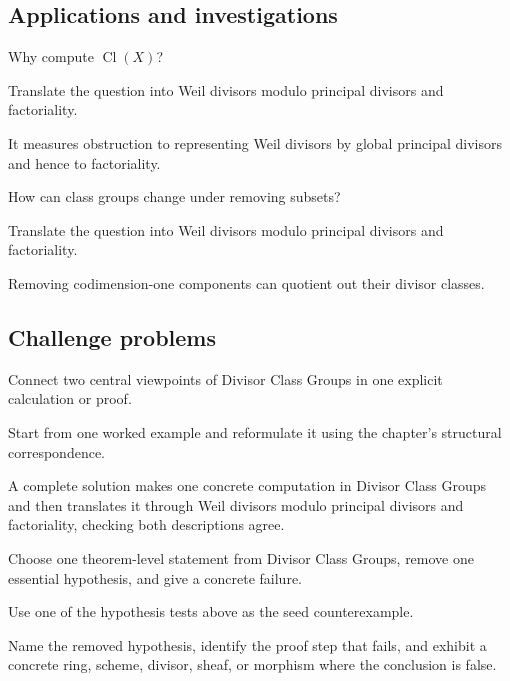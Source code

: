 \subsection*{Applications and investigations}

\begin{exercise}\label{exr:vi41-expand-13}
Why compute $\operatorname{Cl}(X)$?
\end{exercise}
\begin{hint}
Translate the question into Weil divisors modulo principal divisors and factoriality.
\end{hint}
\begin{solution}
It measures obstruction to representing Weil divisors by global principal divisors and hence to factoriality.
\end{solution}

\begin{exercise}\label{exr:vi41-expand-14}
How can class groups change under removing subsets?
\end{exercise}
\begin{hint}
Translate the question into Weil divisors modulo principal divisors and factoriality.
\end{hint}
\begin{solution}
Removing codimension-one components can quotient out their divisor classes.
\end{solution}

\subsection*{Challenge problems}

\begin{exercise}\label{exr:vi41-expand-15}
Connect two central viewpoints of Divisor Class Groups in one explicit calculation or proof.
\end{exercise}
\begin{hint}
Start from one worked example and reformulate it using the chapter's structural correspondence.
\end{hint}
\begin{solution}
A complete solution makes one concrete computation in Divisor Class Groups and then translates it through Weil divisors modulo principal divisors and factoriality, checking both descriptions agree.
\end{solution}

\begin{exercise}\label{exr:vi41-expand-16}
Choose one theorem-level statement from Divisor Class Groups, remove one essential hypothesis, and give a concrete failure.
\end{exercise}
\begin{hint}
Use one of the hypothesis tests above as the seed counterexample.
\end{hint}
\begin{solution}
Name the removed hypothesis, identify the proof step that fails, and exhibit a concrete ring, scheme, divisor, sheaf, or morphism where the conclusion is false.
\end{solution}

